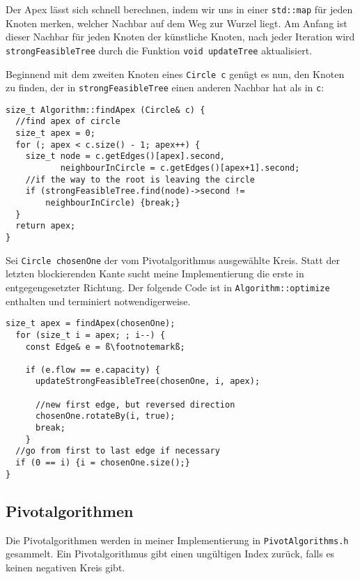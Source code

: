 Der Apex lässt sich schnell berechnen, indem wir uns in einer \lstinline|std::map| für jeden Knoten merken, welcher Nachbar auf dem Weg zur Wurzel liegt. Am Anfang ist dieser Nachbar für jeden Knoten der künstliche Knoten, nach jeder Iteration wird \lstinline|strongFeasibleTree| durch die Funktion \lstinline|void updateTree| aktualisiert.

Beginnend mit dem zweiten Knoten eines \lstinline|Circle c| genügt es nun, den Knoten zu finden, der in \lstinline|strongFeasibleTree| einen anderen Nachbar hat als in \lstinline|c|:

\begin{lstlisting}
size_t Algorithm::findApex (Circle& c) {
  //find apex of circle
  size_t apex = 0;
  for (; apex < c.size() - 1; apex++) {
    size_t node = c.getEdges()[apex].second,
           neighbourInCircle = c.getEdges()[apex+1].second;
    //if the way to the root is leaving the circle
    if (strongFeasibleTree.find(node)->second !=
        neighbourInCircle) {break;}
  }
  return apex;
}
\end{lstlisting}

Sei \lstinline|Circle chosenOne| der vom Pivotalgorithmus ausgewählte Kreis. Statt der letzten blockierenden Kante sucht meine Implementierung die erste in entgegengesetzter Richtung. Der folgende Code ist in \lstinline|Algorithm::optimize| enthalten und terminiert notwendigerweise.

\begin{lstlisting}[escapechar=ß]
  size_t apex = findApex(chosenOne);
  for (size_t i = apex; ; i--) {
    const Edge& e = ß\footnotemarkß;

    if (e.flow == e.capacity) {
      updateStrongFeasibleTree(chosenOne, i, apex);

      //new first edge, but reversed direction
      chosenOne.rotateBy(i, true);
      break;
    }
  //go from first to last edge if necessary
  if (0 == i) {i = chosenOne.size();}
}
\end{lstlisting}


\subsection{Pivotalgorithmen}
Die Pivotalgorithmen werden in meiner Implementierung in \lstinline|PivotAlgorithms.h| gesammelt. Ein Pivotalgorithmus gibt einen ungültigen Index zurück, falls es keinen negativen Kreis gibt.

